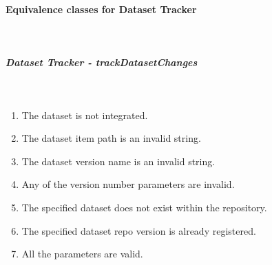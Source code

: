 \paragraph{Equivalence classes for Dataset Tracker} \mbox{}\\

\subparagraph{Dataset Tracker - trackDatasetChanges} \mbox{}\\

\begin{enumerate}
    \item The dataset is not integrated.
    \item The dataset item path is an invalid string.
    \item The dataset version name is an invalid string.
    \item Any of the version number parameters are invalid.
    \item The specified dataset does not exist within the repository.
    \item The specified dataset repo version is already registered.
    \item All the parameters are valid.
\end{enumerate}

